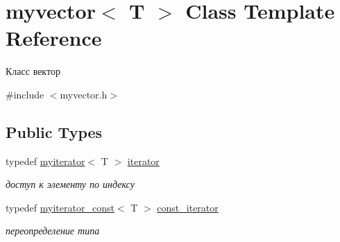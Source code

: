 \hypertarget{classmyvector}{}\section{myvector$<$ T $>$ Class Template Reference}
\label{classmyvector}


Класс вектор  




{\ttfamily \#include $<$myvector.\+h$>$}

\subsection*{Public Types}
\begin{DoxyCompactItemize}
\item 
\hypertarget{classmyvector_a9709c757051bc64d05379f8f9758bc94}{}typedef \hyperlink{classmyiterator}{myiterator}$<$ T $>$ \hyperlink{classmyvector_a9709c757051bc64d05379f8f9758bc94}{iterator}\label{classmyvector_a9709c757051bc64d05379f8f9758bc94}

\begin{DoxyCompactList}\small\item\em доступ к элементу по индексу \end{DoxyCompactList}\item 
\hypertarget{classmyvector_afcc5b3f6a3b4bc122ae97b69e5fb8cb4}{}typedef \hyperlink{classmyiterator__const}{myiterator\+\_\+const}$<$ T $>$ \hyperlink{classmyvector_afcc5b3f6a3b4bc122ae97b69e5fb8cb4}{const\+\_\+iterator}\label{classmyvector_afcc5b3f6a3b4bc122ae97b69e5fb8cb4}

\begin{DoxyCompactList}\small\item\em переопределение типа \end{DoxyCompactList}\end{DoxyCompactItemize}
